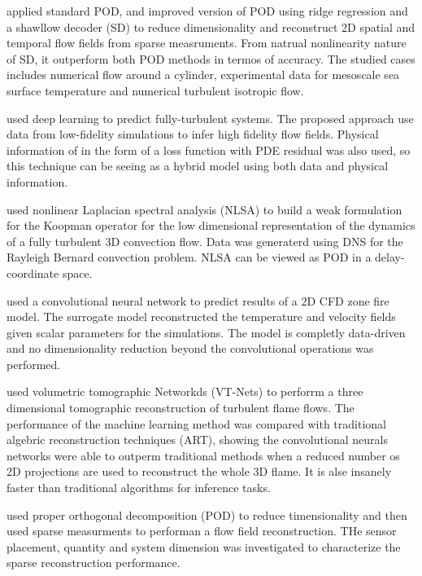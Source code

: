 \cite{erichsonShallow2020} applied standard POD, and improved version of POD using ridge regression and a shawllow decoder (SD) to reduce dimensionality and reconstruct 2D spatial and temporal flow fields from sparse measruments. From natrual nonlinearity nature of SD, it outperform both POD methods in termos of accuracy. The studied cases includes numerical flow around a cylinder, experimental data for mesoscale sea surface temperature and numerical turbulent isotropic flow. 

\cite{genevaMultifidelity2020} used deep learning to predict fully-turbulent systems. The proposed approach use data from low-fidelity simulations to infer high fidelity flow fields. Physical information of in the form of a loss function with PDE residual was also used, so this technique can be seeing as a hybrid model using both data and physical information.

\cite{giannakisKoopman2018} used nonlinear Laplacian spectral analysis (NLSA) to build a weak formulation for the Koopman operator for the low dimensional representation of the dynamics of a fully turbulent 3D convection flow. Data was generaterd using DNS for the Rayleigh Bernard convection problem. NLSA can be viewed as POD in a delay-coordinate space. 

\cite{hodgesCompartment2019} used a convolutional neural network to predict results of a 2D CFD zone fire model. The surrogate model reconstructed the temperature and velocity fields given scalar parameters for the simulations. The model is completly data-driven and no dimensionality reduction beyond the convolutional operations was performed.

\cite{huangLimitedprojection2020} used volumetric tomographic Networkds (VT-Nets) to perforrm a three dimensional tomographic reconstruction of turbulent flame flows. The performance of the machine learning method was compared with traditional algebric reconstruction techniques (ART), showing the convolutional neurals networks were able to outperm traditional methods when a reduced number os 2D projections are used to reconstruct the whole 3D flame. It is alse insanely faster than traditional algorithms for inference tasks.

\cite{jayaramanInterplay2019} used proper orthogonal decomposition (POD) to reduce timensionality and then used sparse measurments to performan a flow field reconstruction. THe sensor placement, quantity and system dimension was investigated to characterize the sparse reconstruction performance.


